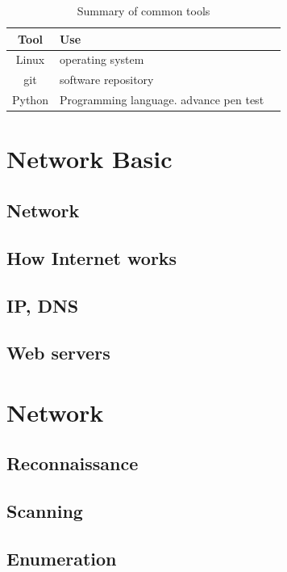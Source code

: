 \documentclass[7x9]{times}
\begin{document}
\begin{table}[]
    \begin{tabular}{|c|l|c|}
        \hline 
        Tool & Use &  \\ 
        \hline 
        Linux & operating system &  \\ 
        \hline 
        git & software repository &  \\ 
        \hline 
        Python & Programming language. advance pen test &  \\ 
        \hline 
    \end{tabular}
    \caption{Summary of common tools}
    \label{tab:tools}
\end{table}



\chapternotes
 

\chapter{Network Basic}


\section{Network}
\section{How Internet works}
\section{IP, DNS}
\section{Web servers}


\chapter{Network}

\section{Reconnaissance}
\section{Scanning}
\section{Enumeration}
\end{document}
